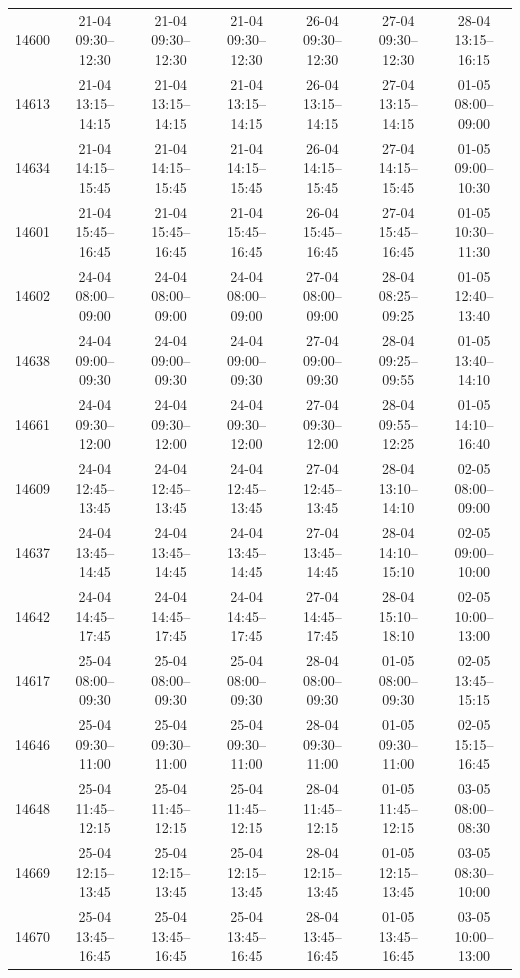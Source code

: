 \begin{table}[htbp]
\begin{tabular}{|r|c|c|c|c|c|c|}
14600 & 21-04 09:30--12:30 & 21-04 09:30--12:30 & 21-04 09:30--12:30 & 26-04 09:30--12:30 & 27-04 09:30--12:30 & 28-04 13:15--16:15 \\ 
14613 & 21-04 13:15--14:15 & 21-04 13:15--14:15 & 21-04 13:15--14:15 & 26-04 13:15--14:15 & 27-04 13:15--14:15 & 01-05 08:00--09:00 \\ 
14634 & 21-04 14:15--15:45 & 21-04 14:15--15:45 & 21-04 14:15--15:45 & 26-04 14:15--15:45 & 27-04 14:15--15:45 & 01-05 09:00--10:30 \\ 
14601 & 21-04 15:45--16:45 & 21-04 15:45--16:45 & 21-04 15:45--16:45 & 26-04 15:45--16:45 & 27-04 15:45--16:45 & 01-05 10:30--11:30 \\ 
14602 & 24-04 08:00--09:00 & 24-04 08:00--09:00 & 24-04 08:00--09:00 & 27-04 08:00--09:00 & 28-04 08:25--09:25 & 01-05 12:40--13:40 \\ 
14638 & 24-04 09:00--09:30 & 24-04 09:00--09:30 & 24-04 09:00--09:30 & 27-04 09:00--09:30 & 28-04 09:25--09:55 & 01-05 13:40--14:10 \\ 
14661 & 24-04 09:30--12:00 & 24-04 09:30--12:00 & 24-04 09:30--12:00 & 27-04 09:30--12:00 & 28-04 09:55--12:25 & 01-05 14:10--16:40 \\ 
14609 & 24-04 12:45--13:45 & 24-04 12:45--13:45 & 24-04 12:45--13:45 & 27-04 12:45--13:45 & 28-04 13:10--14:10 & 02-05 08:00--09:00 \\ 
14637 & 24-04 13:45--14:45 & 24-04 13:45--14:45 & 24-04 13:45--14:45 & 27-04 13:45--14:45 & 28-04 14:10--15:10 & 02-05 09:00--10:00 \\ 
14642 & 24-04 14:45--17:45 & 24-04 14:45--17:45 & 24-04 14:45--17:45 & 27-04 14:45--17:45 & 28-04 15:10--18:10 & 02-05 10:00--13:00 \\ 
14617 & 25-04 08:00--09:30 & 25-04 08:00--09:30 & 25-04 08:00--09:30 & 28-04 08:00--09:30 & 01-05 08:00--09:30 & 02-05 13:45--15:15 \\ 
14646 & 25-04 09:30--11:00 & 25-04 09:30--11:00 & 25-04 09:30--11:00 & 28-04 09:30--11:00 & 01-05 09:30--11:00 & 02-05 15:15--16:45 \\ 
14648 & 25-04 11:45--12:15 & 25-04 11:45--12:15 & 25-04 11:45--12:15 & 28-04 11:45--12:15 & 01-05 11:45--12:15 & 03-05 08:00--08:30 \\ 
14669 & 25-04 12:15--13:45 & 25-04 12:15--13:45 & 25-04 12:15--13:45 & 28-04 12:15--13:45 & 01-05 12:15--13:45 & 03-05 08:30--10:00 \\ 
14670 & 25-04 13:45--16:45 & 25-04 13:45--16:45 & 25-04 13:45--16:45 & 28-04 13:45--16:45 & 01-05 13:45--16:45 & 03-05 10:00--13:00 \\ 

\end{tabular}
\end{table}
